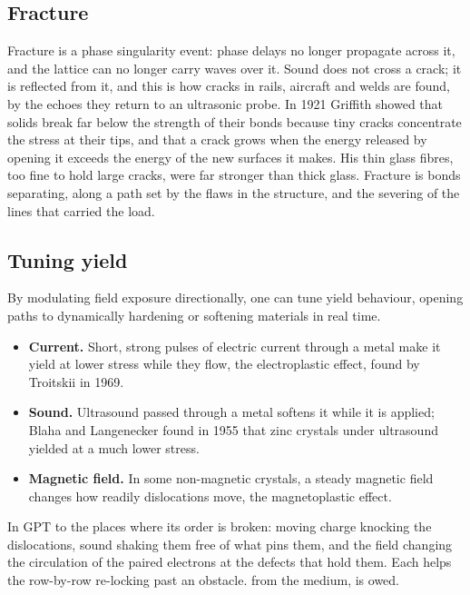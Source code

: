 \documentclass[11pt,a4paper]{article}
\begin{document}
\subsection{Fracture}

Fracture is a phase singularity event: phase delays no longer propagate across it, and the lattice can no longer carry waves over it.  Sound does not cross a crack; it is reflected from it, and this is how cracks in rails, aircraft and welds are found, by the echoes they return to an ultrasonic probe.  In 1921 Griffith showed that solids break far below the strength of their bonds because tiny cracks concentrate the stress at their tips, and that a crack grows when the energy released by opening it exceeds the energy of the new surfaces it makes. His thin glass fibres, too fine to hold large cracks, were far stronger than thick glass. Fracture is bonds separating, along a path set by the flaws in the structure, and the severing of the lines that carried the load.

\subsection{Tuning yield}

By modulating field exposure directionally, one can tune yield behaviour, opening paths to dynamically hardening or softening materials in real time. 
\begin{itemize}
\item \textbf{Current.} Short, strong pulses of electric current through a metal make it yield at lower stress while they flow, the electroplastic effect, found by Troitskii in 1969.
\item \textbf{Sound.} Ultrasound passed through a metal softens it while it is applied; Blaha and Langenecker found in 1955 that zinc crystals under ultrasound yielded at a much lower stress.
\item \textbf{Magnetic field.} In some non-magnetic crystals, a steady magnetic field changes how readily dislocations move, the magnetoplastic effect.
\end{itemize}
In GPT  to the places where its order is broken: moving charge knocking the dislocations, sound shaking them free of what pins them, and the field changing the circulation of the paired electrons at the defects that hold them. Each helps the row-by-row re-locking past an obstacle.  from the medium, is owed.
\end{document}
